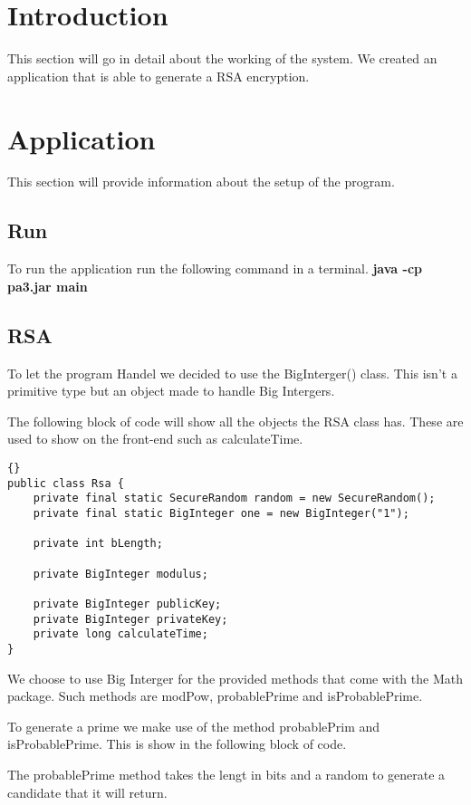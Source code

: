 \section{Introduction} \label{man-introduction}
This section will go in detail about the working of the system.
We created an application that is able to generate a RSA encryption.

\section{Application} \label{man-application}
This section will provide information about the setup of the program.

\subsection{Run}
To run the application run the following command in a terminal. \newline
\textbf{java -cp pa3.jar main}


\subsection{RSA}
To let the program Handel we decided to use the BigInterger() class.
This isn't a primitive type but an object made to handle Big Intergers.

The following block of code will show all the objects the RSA class has.
These are used to show on the front-end such as calculateTime.

\begin{lstlisting}{}
public class Rsa {
    private final static SecureRandom random = new SecureRandom();
    private final static BigInteger one = new BigInteger("1");

    private int bLength;

    private BigInteger modulus;

    private BigInteger publicKey;
    private BigInteger privateKey;
    private long calculateTime; 
}
\end{lstlisting}

We choose to use Big Interger for the provided methods that come with the Math package.
Such methods are modPow, probablePrime and isProbablePrime.

To generate a prime we make use of the method probablePrim and isProbablePrime.
This is show in the following block of code.

The probablePrime method takes the lengt in bits and a random to generate a candidate that it will return.


